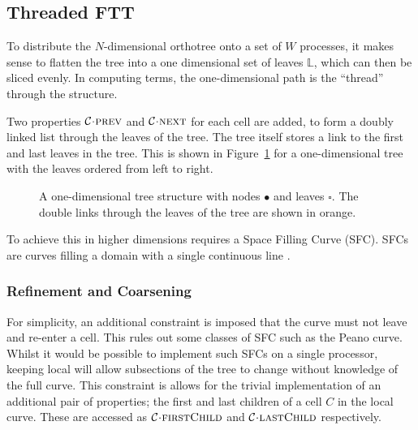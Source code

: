 \documentclass[twoside]{IIBproject}
\newcommand{\acc}{{\mkern 0.5mu\cdot\mkern 0.5mu}}
\numberwithin{figure}{section}
\begin{document}
    \subsection{Threaded FTT} %
        \label{sec:tftt}

        To distribute the $N$-dimensional orthotree onto a set of $W$ processes, it makes sense to flatten the tree into a one dimensional set of leaves $\mathbb{L}$, which can then be sliced evenly. In computing terms, the one-dimensional path is the ``thread'' through the structure. 

        Two properties $\mathcal{C}\acc\textproc{prev}$ and $\mathcal{C}\acc\textproc{next}$ for each cell are added, to form a doubly linked list through the leaves of the tree. The tree itself stores a link to the first and last leaves in the tree. This is shown in Figure~\ref{fig:tftt-flattree} for a one-dimensional tree with the leaves ordered from left to right. 

        \begin{figure}[H]
            \centering
            
            \caption{A one-dimensional tree structure with nodes $\bullet$ and leaves $\square$. The double links through the leaves of the tree are shown in orange.}
            \label{fig:tftt-flattree}
        \end{figure}

        To achieve this in higher dimensions requires a Space Filling Curve (SFC). SFCs are curves filling a domain with a single continuous line \cite{bader2013}. 


        \subsubsection{Refinement and Coarsening} %
            \label{sec:tftt-refine}

            For simplicity, an additional constraint is imposed that the curve must not leave and re-enter a cell. This rules out some classes of SFC such as the Peano curve. Whilst it would be possible to implement such SFCs on a single processor, keeping local will allow subsections of the tree to change without knowledge of the full curve. This constraint is allows for the trivial implementation of  an additional pair of properties; the first and last children of a cell $C$ in the local curve. These are accessed as $\mathcal{C}\acc\textproc{firstChild}$ and $\mathcal{C}\acc\textproc{lastChild}$ respectively.
\end{document}
